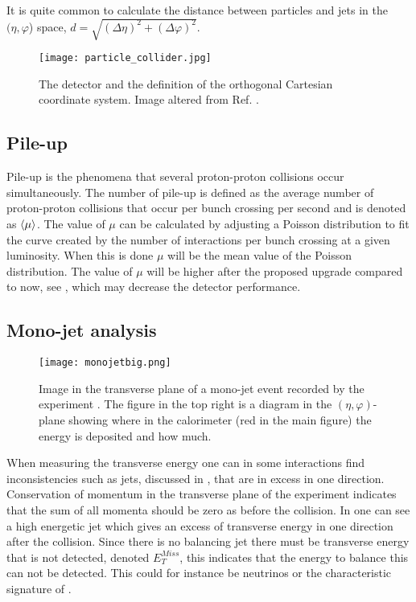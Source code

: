 It is quite common to calculate the distance between particles and jets in the $(\eta,\varphi$) space, $d=\sqrt{(\Delta \eta)^2 + (\Delta \varphi)^2}$. 

\begin{figure}[ht]
\begin{center}
\texttt{[image: particle\_collider.jpg]}
\caption{The \abbrATLAS detector and the definition of the orthogonal Cartesian coordinate system. Image altered from Ref. \citep{coordimage}.}
\label{fig:coordinatesystem}
\end{center}
\end{figure}

\subsection{Pile-up}\label{sec:eo:subsec:pile}

Pile-up is the phenomena that several proton-proton collisions occur simultaneously. The number of pile-up is defined as the average number of proton-proton collisions that occur per bunch crossing per second and is denoted as $\left<\mu\right>$. The value of $\mu$ can be calculated by adjusting a Poisson distribution to fit the curve created by the number of interactions per bunch crossing at a given luminosity. When this is done $\mu$ will be the mean value of the Poisson distribution. The value of $\mu$ will be higher after the proposed upgrade compared to now, see , which may decrease the detector performance.

\subsection{Mono-jet analysis}\label{sec:eo:subsec:mjet}

\begin{figure}[ht]
\texttt{[image: monojetbig.png]}
\caption{Image in the transverse plane of a mono-jet event recorded by the \abbrATLAS experiment \citep{monojet}. The figure in the top right is a diagram in the $(\eta,\varphi)$-plane showing where in the calorimeter (red in the main figure) the energy is deposited and how much.}
\label{fig:monojet}
\end{figure}

When measuring the transverse energy one can in some interactions find inconsistencies such as jets, discussed in , that are in excess in one direction. Conservation of momentum in the transverse plane of the experiment indicates that the sum of all momenta should be zero as before the collision. In  one can see a high energetic jet which gives an excess of transverse energy in one direction after the collision. Since there is no balancing jet there must be transverse energy that is not detected, denoted $E_T^{Miss}$, this indicates that the energy to balance this can not be detected. This could for instance be neutrinos or the characteristic signature of \abbrWIMPS .

